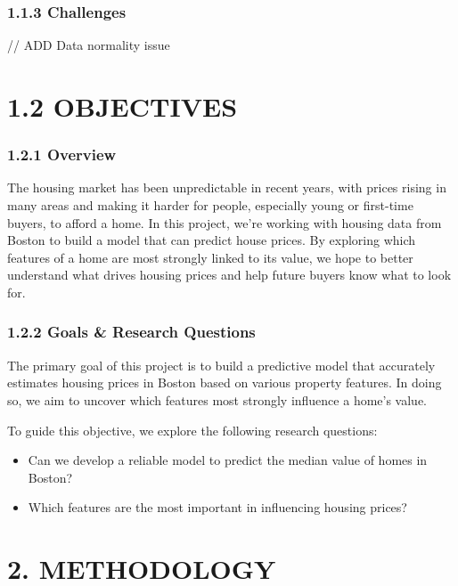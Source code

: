 \documentclass[
]{article}
\providecommand{\tightlist}{%
  \setlength{\itemsep}{0pt}\setlength{\parskip}{0pt}}
\begin{document}
\subsubsection{1.1.3 Challenges}\label{challenges}

// ADD Data normality issue

\hfill\break
\hfill\break

\section{1.2 OBJECTIVES}\label{objectives}

\subsubsection{1.2.1 Overview}\label{overview}

The housing market has been unpredictable in recent years, with prices
rising in many areas and making it harder for people, especially young
or first-time buyers, to afford a home. In this project, we're working
with housing data from Boston to build a model that can predict house
prices. By exploring which features of a home are most strongly linked
to its value, we hope to better understand what drives housing prices
and help future buyers know what to look for.

\subsubsection{1.2.2 Goals \& Research
Questions}\label{goals-research-questions}

The primary goal of this project is to build a predictive model that
accurately estimates housing prices in Boston based on various property
features. In doing so, we aim to uncover which features most strongly
influence a home's value.

To guide this objective, we explore the following research questions:

\begin{itemize}
\tightlist
\item
  Can we develop a reliable model to predict the median value of homes
  in Boston?\\
\item
  Which features are the most important in influencing housing prices?
\end{itemize}

\hfill\break
\hfill\break
\hfill\break

\section{2. METHODOLOGY}\label{methodology}
\end{document}
